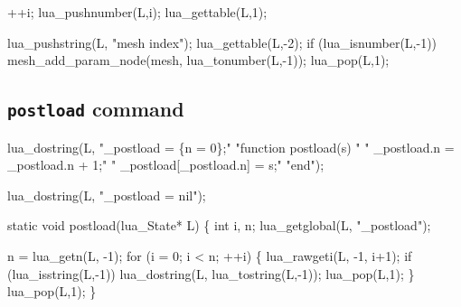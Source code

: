 \nwendcode{}\nwdocspar

\nwenddocs{}\endmoddef
++i;
lua_pushnumber(L,i);
lua_gettable(L,1);
\nwendcode{}\nwdocspar

\nwenddocs{}\endmoddef
lua_pushstring(L, "mesh index");
lua_gettable(L,-2);
if (lua_isnumber(L,-1))
     mesh_add_param_node(mesh, lua_tonumber(L,-1));
lua_pop(L,1);
\nwendcode{}\nwdocspar


\subsection{{\tt{}postload} command}

\nwenddocs{}\plusendmoddef
lua_dostring(L, 
             "_postload = \{n = 0\};"
             "function postload(s) "
             "  _postload.n = _postload.n + 1;"
             "  _postload[_postload.n] = s;"
             "end");
\nwendcode{}\nwdocspar

\nwenddocs{}\plusendmoddef
lua_dostring(L, "_postload = nil");
\nwendcode{}\nwdocspar

\nwenddocs{}\plusendmoddef
static void postload(lua_State* L)
\{
    int i, n;
    lua_getglobal(L, "_postload");

    n = lua_getn(L, -1);
    for (i = 0; i < n; ++i) \{
        lua_rawgeti(L, -1, i+1);
        if (lua_isstring(L,-1))
            lua_dostring(L, lua_tostring(L,-1));
        lua_pop(L,1);
    \}
    lua_pop(L,1);
\}


